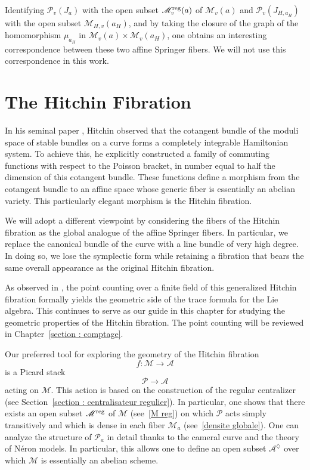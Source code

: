 \documentclass[12pt,english]{smfart}
\numberwithin{equation}{subsection}
\theoremstyle{remark}
\newcommand\calA{{\mathscr A}}
\newcommand\calP{{\mathscr P}}
\newcommand\calM{{\mathscr M}}
\newcommand\reg{{\rm reg}}
\begin{document}
Identifying $\calP_v(J_a)$ with the open subset $\calM_v^\reg(a)$ of $\calM_v(a)$ and $\calP_v(J_{H,a_H})$ with the open subset $\calM_{H,v}(a_H)$, and by taking the closure of the graph of the homomorphism $\mu_{a_H}$ in $\calM_v(a)\times \calM_v(a_H)$, one obtains an interesting correspondence between these two affine Springer fibers. We will not use this correspondence in this work.


\section{The Hitchin Fibration}
\label{section : Fibration de Hitchin}

In his seminal paper \cite{H}, Hitchin observed that the cotangent bundle of the moduli space of stable bundles on a curve forms a completely integrable Hamiltonian system. To achieve this, he explicitly constructed a family of commuting functions with respect to the Poisson bracket, in number equal to half the dimension of this cotangent bundle. These functions define a morphism from the cotangent bundle to an affine space whose generic fiber is essentially an abelian variety. This particularly elegant morphism is the Hitchin fibration.

We will adopt a different viewpoint by considering the fibers of the Hitchin fibration as the global analogue of the affine Springer fibers. In particular, we replace the canonical bundle of the curve with a line bundle of very high degree. In doing so, we lose the symplectic form while retaining a fibration that bears the same overall appearance as the original Hitchin fibration.

As observed in \cite{N}, the point counting over a finite field of this generalized Hitchin fibration formally yields the geometric side of the trace formula for the Lie algebra. This continues to serve as our guide in this chapter for studying the geometric properties of the Hitchin fibration. The point counting will be reviewed in Chapter~\ref{section : comptage}.

Our preferred tool for exploring the geometry of the Hitchin fibration
$$f:\calM\longrightarrow \calA$$
is a Picard stack
$$\calP\longrightarrow \calA$$
acting on $\calM$. This action is based on the construction of the regular centralizer (see Section~\ref{section : centralisateur regulier}). In particular, one shows that there exists an open subset $\calM^\reg$ of $\calM$ (see~\ref{M reg}) on which $\calP$ acts simply transitively and which is dense in each fiber $\calM_a$ (see~\ref{densite globale}). One can analyze the structure of $\calP_a$ in detail thanks to the cameral curve and the theory of N\'eron models. In particular, this allows one to define an open subset $\calA^\diamondsuit$ over which $\calM$ is essentially an abelian scheme.
\end{document}
